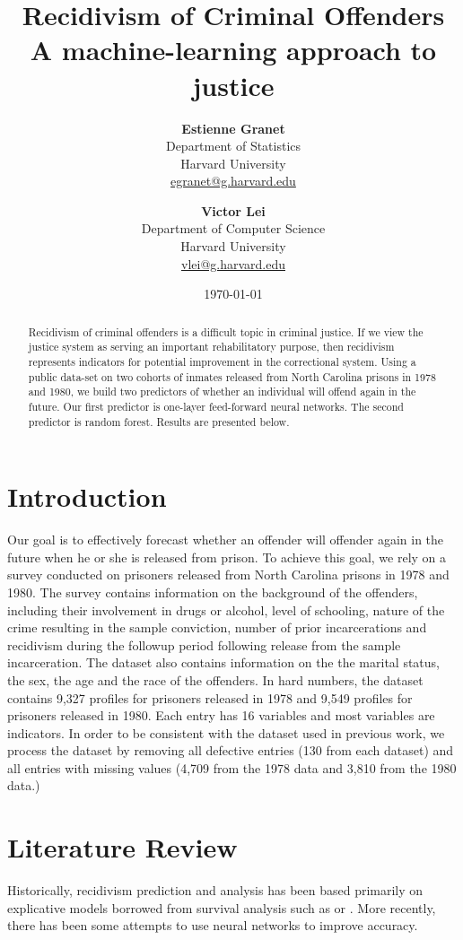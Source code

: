 \documentclass[a4paper]{article}
\title{\Huge Recidivism of Criminal Offenders \newline \LARGE A machine-learning approach to justice \newline {}}
\author{\textbf{Estienne Granet} \\
  Department of Statistics\\
  Harvard University \\
  \href{mailto:egranet@g.harvard.edu}{egranet@g.harvard.edu}
  \and
  \textbf{Victor Lei} \\
  Department of Computer Science\\
  Harvard University \\
  \href{mailto:vlei@g.harvard.edu}{vlei@g.harvard.edu}}
\date{\today}
\theoremstyle{plain}
\begin{document}
\maketitle

\begin{abstract}
Recidivism of criminal offenders is a difficult topic in criminal justice. If we view the justice system as serving an important rehabilitatory purpose, then recidivism represents indicators for potential improvement in the correctional system. Using a public data-set on two cohorts of inmates released from North Carolina prisons in 1978 and 1980, we build two predictors of whether an individual will offend again in the future. Our first predictor is one-layer feed-forward neural networks. The second predictor is random forest. Results are presented below.
\end{abstract}

\section*{Introduction}

Our goal is to effectively forecast whether an offender will offender again in the future when he or she is released from prison. To achieve this goal, we rely on a survey conducted on prisoners released from North Carolina prisons in 1978 and 1980. The survey contains information on the background of the offenders, including their involvement in drugs or alcohol, level of schooling, nature of the crime resulting in the sample conviction, number of prior incarcerations and recidivism during the followup period following release from the sample
incarceration. The dataset also contains information on the
the marital status, the sex, the age and the race of the offenders. In hard numbers, the dataset contains 9,327 profiles for prisoners released in 1978 and 9,549 profiles for prisoners released in 1980. Each entry has 16 variables and most variables are indicators. In order to be consistent with the dataset used in previous work, we process the dataset by removing all defective entries (130 from each dataset) and all entries with missing values (4,709 from the 1978 data and 3,810 from the 1980 data.) \cite{bib1}

\paragraph{}
\section{Literature Review}
Historically, recidivism prediction and analysis has been based primarily on explicative models borrowed from survival analysis such as \cite{bib2} or \cite{bib3}. More recently, there has been some attempts to use neural networks to improve accuracy.
\end{document}
